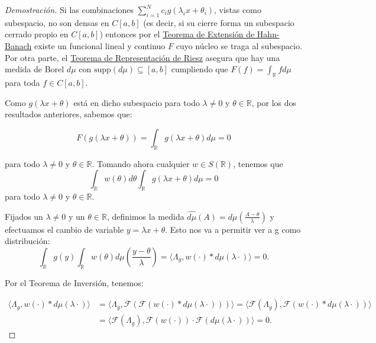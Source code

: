 \begin{proof}[Demostración]
Si las combinaciones \( \sum_{i=1}^{N} c_{i}g(\lambda_{i}x+\theta_{i})\), vistas como subespacio, no son densas en \( C[a,b]\) (es decir, si su cierre forma un subespacio cerrado propio en $C[a,b]$) entonces por el \hyperref[thm:h03]{Teorema de Extensión de Hahn-Banach} existe un funcional lineal y continuo $F$ cuyo núcleo se traga al subespacio. Por otra parte, el \hyperref[thm:h04]{Teorema de Representación de Riesz} asegura que hay una medida de Borel $d\mu$ con \( \mathrm{supp}(d\mu) \subseteq [a,b] \) cumpliendo que $F(f) = \int_{\mathds{R}}fd\mu$ para toda $f\in C[a,b]$. 

Como $g(\lambda x + \theta)$ está en dicho subespacio para todo $\lambda\neq 0$ y $\theta\in\mathds{R}$, por los dos resultados anteriores, sabemos que: 

\[F(g(\lambda x + \theta)) = \int_{\mathds{R}}g(\lambda x + \theta )d\mu = 0\]

para todo \(\lambda \neq 0\) y \(\theta \in \mathds{R}\). Tomando ahora cualquier \(w \in S(\mathds{R})\), tenemos que 
\begin{equation}
\int_{\mathds{R}}w(\theta)d\theta\int_{\mathds{R}}g(\lambda x + \theta)d\mu = 0 
\end{equation}
para todo $\lambda \neq 0$ y $\theta\in\mathds{R}$.  

Fijados un  $\lambda \neq 0$ y un $\theta\in\mathds{R}$, definimos la medida $\hat{d\mu}(A)= d\mu(\frac{A-\theta}{\lambda})$ y efectuamos el cambio de variable  \(y = \lambda x + \theta\). Esto nos va a permitir ver a g como distribución: 
\begin{equation}\label{eq:id04}
\int_{\mathds{R}}g(y) \int_{\mathds{R}}w(\theta)d\mu(\frac{y-\theta}{ \lambda}) = \langle \Lambda_{g}, w(\cdot)\ast d\mu (\lambda\cdot)\rangle = 0.
\end{equation}


Por el Teorema de Inversión, tenemos: 


\begin{align}\label{eq:id05}
\langle \Lambda_{g}, w(\cdot)\ast d\mu (\lambda\cdot)\rangle 
& = \langle \Lambda_{g}, \mathcal{F}(\mathcal{F}( w(\cdot)\ast d\mu (\lambda\cdot)))\rangle
= \langle \mathcal{F}(\Lambda_{g}),\mathcal{F}( w(\cdot)\ast d\mu (\lambda\cdot))\rangle \nonumber \\ &
= \langle \mathcal{F}(\Lambda_{g}),\mathcal{F}( w(\cdot))\cdot \mathcal{F}(d\mu (\lambda\cdot))\rangle = 0.
\end{align}




\end{proof}
